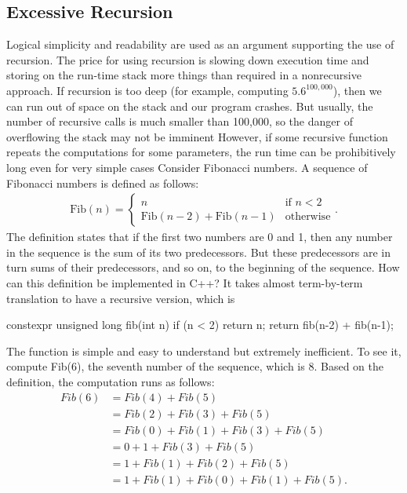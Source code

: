 \documentclass{report}
\begin{document}
    \subsection{Excessive Recursion}
    \bigbreak \noindent 
    Logical simplicity and readability are used as an argument supporting the use of recursion. The price for using recursion is slowing down execution time and storing on
    the run-time stack more things than required in a nonrecursive approach. If recursion is too deep (for example, computing $5.6^{100,000}$), then we can run out of space on
the stack and our program crashes. But usually, the number of recursive calls is much
smaller than 100,000, so the danger of overflowing the stack may not be imminent
\bigbreak \noindent 
However, if some recursive function repeats the computations for some parameters, the run time can be prohibitively long even for very simple cases
\bigbreak \noindent 
Consider Fibonacci numbers. A sequence of Fibonacci numbers is defined as follows:
\begin{align*}
    \text{Fib}(n) =
    \begin{cases}
        n & \text{if } n < 2  \\
        \text{Fib}(n-2) + \text{Fib}(n-1) & \text{otherwise}
    \end{cases}
.\end{align*}
\bigbreak \noindent 
The definition states that if the first two numbers are 0 and 1, then any number in the
sequence is the sum of its two predecessors. But these predecessors are in turn sums
of their predecessors, and so on, to the beginning of the sequence. 
\bigbreak \noindent 
How can this definition be implemented in C++? It takes almost term-by-term
translation to have a recursive version, which is
\bigbreak \noindent 
\begin{cppcode}
constexpr unsigned long fib(int n) {
    if (n < 2) return n;
    return fib(n-2) + fib(n-1);
}
\end{cppcode}
\bigbreak \noindent 
The function is simple and easy to understand but extremely inefficient. To see
it, compute Fib(6), the seventh number of the sequence, which is 8. Based on the
definition, the computation runs as follows:
\begin{align*}
    Fib(6)	&= Fib(4) + Fib(5) \\
            &= Fib(2) 	+ 	Fib(3) 	+ Fib(5) \\
            &= Fib(0)+Fib(1) 	+ 	Fib(3) 	+ Fib(5) \\
            &= 0 + 1 	+ 	Fib(3) 	+ Fib(5) \\
            &= 1 	+ Fib(1)+ Fib(2) 	+ Fib(5) \\
            &= 1 	+ Fib(1)+Fib(0)+Fib(1)	+ Fib(5)   
.\end{align*}
\end{document}
